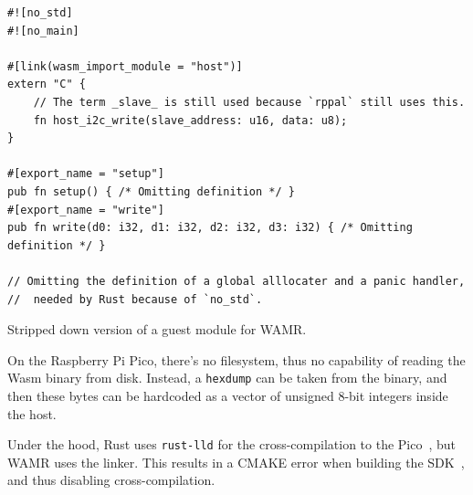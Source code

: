 \begin{listing}[h]
\begin{verbatim}
#![no_std]
#![no_main]

#[link(wasm_import_module = "host")]
extern "C" {
    // The term _slave_ is still used because `rppal` still uses this.
    fn host_i2c_write(slave_address: u16, data: u8);
}

#[export_name = "setup"]
pub fn setup() { /* Omitting definition */ }
#[export_name = "write"]
pub fn write(d0: i32, d1: i32, d2: i32, d3: i32) { /* Omitting definition */ }

// Omitting the definition of a global alllocater and a panic handler,
//  needed by Rust because of `no_std`.
\end{verbatim}
\caption{Stripped down version of a guest module for WAMR.}
\label{code:wamr:guest}
\end{listing}



On the Raspberry Pi Pico, there's no filesystem, thus no capability of reading the \gls{Wasm} binary from disk. Instead, a \texttt{hexdump} can be taken from the binary, and then these bytes can be hardcoded as a vector of unsigned 8-bit integers inside the host. 

Under the hood, Rust uses \texttt{rust-lld} for the cross-compilation to the Pico~\cite{lld}, but WAMR uses the  linker. This results in a CMAKE error when building the SDK~\cite{gh:wrs:error}, and thus disabling cross-compilation.


